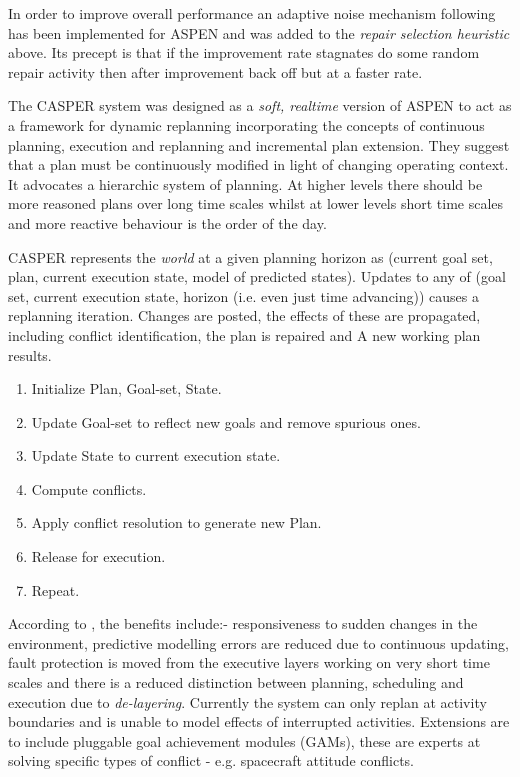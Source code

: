 In order to improve overall performance an adaptive noise mechanism following \citet{hoos02adaptive} has been implemented for ASPEN \citep{fukunaga04robust} and was added to the \emph{repair selection heuristic} above. Its precept is that if the improvement rate stagnates do some random repair activity then after improvement back off but at a faster rate.%

The CASPER system \citep{chien99iterative, chien00aspen} was designed as a \emph{soft, realtime} version of ASPEN to act as a framework for dynamic replanning incorporating the concepts of continuous planning, execution and replanning and incremental plan extension. They suggest that a plan must be continuously modified in light of changing operating context. It advocates a hierarchic system of planning. At higher levels there should be more reasoned plans over long time scales whilst at lower levels short time scales and more reactive behaviour is the order of the day. %

CASPER represents the \emph{world} at a given planning horizon as (current goal set, plan, current execution state, model of predicted states). Updates to any of (goal set, current execution state, horizon (i.e. even just time advancing)) causes a replanning iteration. Changes are posted, the effects of these are propagated, including conflict identification, the plan is repaired and A new working plan results.

\begin{enumerate}
\item Initialize Plan, Goal-set, State.
\item Update Goal-set to reflect new goals and remove spurious ones.
\item Update State to current execution state.
\item Compute conflicts.
\item Apply conflict resolution to generate new Plan.
\item Release for execution.
\item Repeat.
\end{enumerate}

According to \citet{chien98integrated}, the benefits include:- responsiveness to sudden changes in the environment, predictive modelling errors are reduced due to continuous updating, fault protection is moved from the executive layers working on very short time scales and there is a reduced distinction between planning, scheduling and execution due to \emph{de-layering}. Currently the system can only replan at activity boundaries and is unable to model effects of interrupted activities. Extensions are to include pluggable goal achievement modules (GAMs), these are experts at solving specific types of conflict - e.g. spacecraft attitude conflicts.

